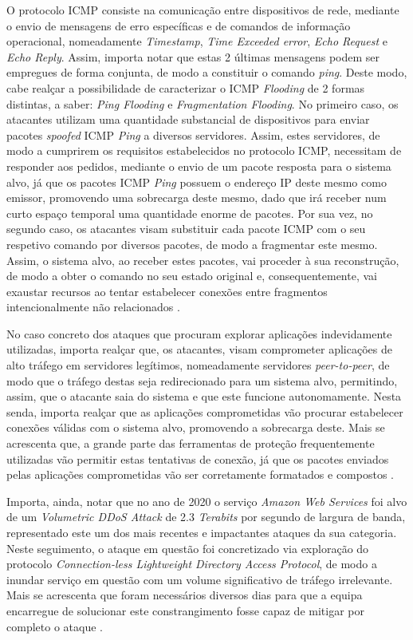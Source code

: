 O protocolo ICMP consiste na comunicação entre dispositivos de rede, mediante o envio de mensagens de erro específicas e de comandos de informação operacional, nomeadamente \textit{Timestamp}, \textit{Time Exceeded error}, \textit{Echo Request} e \textit{Echo Reply}. Assim, importa notar que estas 2 últimas mensagens podem ser empregues de forma conjunta, de modo a constituir o comando \textit{ping}. Deste modo, cabe realçar a possibilidade de caracterizar o ICMP \textit{Flooding} de 2 formas distintas, a saber: \textit{Ping Flooding} e \textit{Fragmentation Flooding}. No primeiro caso, os atacantes utilizam uma quantidade substancial de dispositivos para enviar pacotes \textit{spoofed} ICMP \textit{Ping} a diversos servidores. Assim, estes servidores, de modo a cumprirem os requisitos estabelecidos no protocolo ICMP, necessitam de responder aos pedidos, mediante o envio de um pacote resposta para o sistema alvo, já que os pacotes ICMP \textit{Ping} possuem o endereço IP deste mesmo como emissor, promovendo uma sobrecarga deste mesmo, dado que irá receber num curto espaço temporal uma quantidade enorme de pacotes. Por sua vez, no segundo caso, os atacantes visam substituir cada pacote ICMP com o seu respetivo comando por diversos pacotes, de modo a fragmentar este mesmo. Assim, o sistema alvo, ao receber estes pacotes, vai proceder à sua reconstrução, de modo a obter o comando no seu estado original e, consequentemente, vai exaustar recursos ao tentar estabelecer conexões entre fragmentos intencionalmente não relacionados \cite{esecurityplanet_types_of_ddos_attacks}.

No caso concreto dos ataques que procuram explorar aplicações indevidamente utilizadas, importa realçar que, os atacantes, visam comprometer aplicações de alto tráfego em servidores legítimos, nomeadamente servidores \textit{peer-to-peer}, de modo que o tráfego destas seja redirecionado para um sistema alvo, permitindo, assim, que o atacante saia do sistema e que este funcione autonomamente. Nesta senda, importa realçar que as aplicações comprometidas vão procurar estabelecer conexões válidas com o sistema alvo, promovendo a sobrecarga deste. Mais se acrescenta que, a grande parte das ferramentas de proteção frequentemente utilizadas vão permitir estas tentativas de conexão, já que os pacotes enviados pelas aplicações comprometidas vão ser corretamente formatados e compostos \cite{esecurityplanet_types_of_ddos_attacks}.

Importa, ainda, notar que no ano de 2020 o serviço \textit{Amazon Web Services} foi alvo de um \textit{Volumetric DDoS Attack} de 2.3 \textit{Terabits} por segundo de largura de banda, representado este um dos mais recentes e impactantes ataques da sua categoria. Neste seguimento, o ataque em questão foi concretizado via exploração do protocolo \textit{Connection-less Lightweight Directory Access Protocol}, de modo a inundar serviço em questão com um volume significativo de tráfego irrelevante. Mais se acrescenta que foram necessários diversos dias para que a equipa encarregue de solucionar este constrangimento fosse capaz de mitigar por completo o ataque \cite{connectwise_types_of_ddos_attacks,aws_ddos_2020}.

